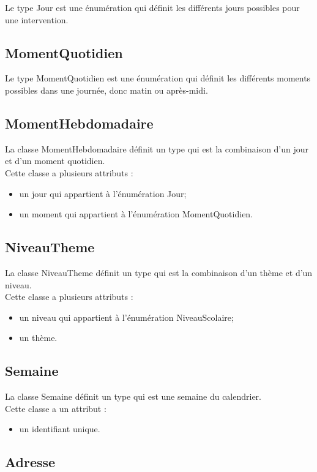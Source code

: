 \documentclass[asi, sansVersion]{picInsa}
\begin{document}
Le type Jour est une énumération qui définit les différents jours possibles pour une intervention.

\subsection*{MomentQuotidien}

Le type MomentQuotidien est une énumération qui définit les différents moments possibles dans une journée, donc matin ou après-midi.

\subsection*{MomentHebdomadaire}

La classe MomentHebdomadaire définit un type qui est la combinaison d'un jour et d'un moment quotidien.\\
Cette classe a plusieurs attributs :
\begin{itemize}
\item un jour qui appartient à l'énumération Jour;
\item un moment qui appartient à l'énumération MomentQuotidien.
\end{itemize}

\subsection*{NiveauTheme}

La classe NiveauTheme définit un type qui est la combinaison d'un thème et d'un niveau.\\
Cette classe a plusieurs attributs : 
\begin{itemize}
\item un niveau qui appartient à l'énumération NiveauScolaire;
\item un thème.
\end{itemize}

\subsection*{Semaine}

La classe Semaine définit un type qui est une semaine du calendrier.\\
Cette classe a un attribut : 
\begin{itemize}
\item un identifiant unique.
\end{itemize}

\subsection*{Adresse}
\end{document}

